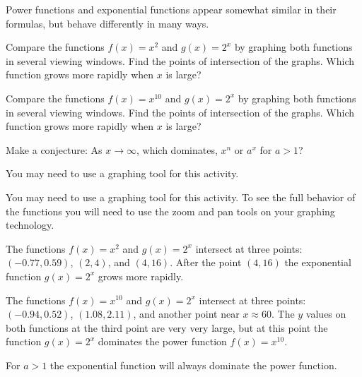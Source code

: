 \begin{activity}\label{A:0.6.1}
Power functions and exponential functions appear somewhat similar in their formulas, but behave differently in many ways.  
\ba
	\item Compare the functions $f(x)=x^2$ and $g(x)=2^x$ by graphing both functions in several viewing windows.  Find the points of intersection of the graphs.  Which function grows more rapidly when $x$ is large?
    \item Compare the functions $f(x)=x^{10}$ and $g(x)=2^x$ by graphing both functions in several viewing windows.  Find the points of intersection of the graphs.  Which function grows more rapidly when $x$ is large?
	\item Make a conjecture: As $x\to\infty$, which dominates, $x^n$ or $a^x$ for $a>1$?
        \ea

\end{activity}
\begin{smallhint}
You may need to use a graphing tool for this activity.
\end{smallhint}
\begin{bighint}
You may need to use a graphing tool for this activity. To see the full behavior of the
functions you will need to use the zoom and pan tools on your graphing technology.
\end{bighint}
\begin{activitySolution}
   \ba
        \item The functions $f(x) = x^2$ and $g(x) = 2^x$ intersect at three points:
            $(-0.77,0.59)$, $(2,4)$, and $(4,16)$.  After the point $(4,16)$ the
            exponential function $g(x) = 2^x$ grows more rapidly.
        \item The functions $f(x) = x^{10}$ and $g(x) = 2^x$ intersect at three points:
            $(-0.94, 0.52)$, $(1.08, 2.11)$, and another point near $x \approx 60$.  The
            $y$ values on both functions at the third point are very very large, but at
            this point the function $g(x) = 2^x$ dominates the power function $f(x) =
            x^{10}$.
        \item For $a>1$ the exponential function will always dominate the power function.
        \item 
   \ea
\end{activitySolution}

\aftera
